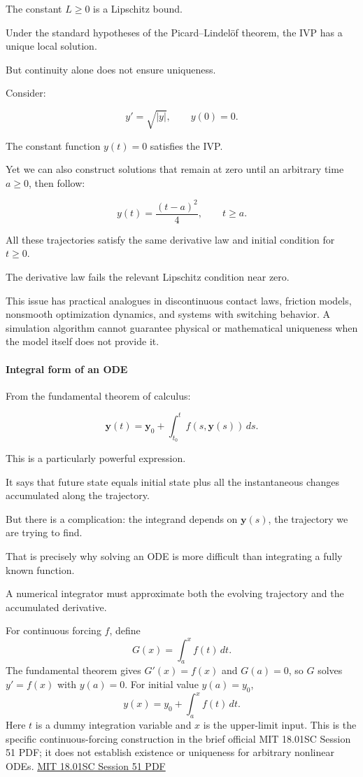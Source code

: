 The constant \(L\ge0\) is a Lipschitz bound.

Under the standard hypotheses of the Picard--Lindelöf theorem, the IVP has a unique local solution.

But continuity alone does not ensure uniqueness.

Consider:

\[
y'=\sqrt{|y|}, \qquad y(0)=0.
\]

The constant function \(y(t)=0\) satisfies the IVP.

Yet we can also construct solutions that remain at zero until an arbitrary time \(a\ge0\), then follow:

\[
y(t)=\frac{(t-a)^2}{4}, \qquad t\ge a.
\]

All these trajectories satisfy the same derivative law and initial condition for \(t\ge0\).

The derivative law fails the relevant Lipschitz condition near zero.

This issue has practical analogues in discontinuous contact laws, friction models, nonsmooth optimization dynamics, and systems with switching behavior. A simulation algorithm cannot guarantee physical or mathematical uniqueness when the model itself does not provide it.

\paragraph{Integral form of an ODE}\label{02-foundations-ii-ch022-integral-form-of-an-ode}

\hypertarget{02-foundations-ii-ch022-integral-form-of-an-ode}{}

From the fundamental theorem of calculus:

\[
\boxed{ \mathbf y(t) = \mathbf y_0+ \int_{t_0}^{t}f(s,\mathbf y(s))\,ds }.
\]

This is a particularly powerful expression.

It says that future state equals initial state plus all the instantaneous changes accumulated along the trajectory.

But there is a complication: the integrand depends on \(\mathbf y(s)\), the trajectory we are trying to find.

That is precisely why solving an ODE is more difficult than integrating a fully known function.

A numerical integrator must approximate both the evolving trajectory and the accumulated derivative.

For continuous forcing \(f\), define \[
G(x)=\int_a^x f(t)\,dt.
\] The fundamental theorem gives \(G'(x)=f(x)\) and \(G(a)=0\), so \(G\) solves \(y'=f(x)\) with \(y(a)=0\). For initial value \(y(a)=y_0\), \[
y(x)=y_0+\int_a^x f(t)\,dt.
\] Here \(t\) is a dummy integration variable and \(x\) is the upper-limit input. This is the specific continuous-forcing construction in the brief official MIT 18.01SC Session 51 PDF; it does not establish existence or uniqueness for arbitrary nonlinear ODEs. \href{https://ocw.mit.edu/courses/18-01sc-single-variable-calculus-fall-2010/2459faee7ec3308afd5cca2b95fad48e_MIT18_01SCF10_Ses51a.pdf}{MIT 18.01SC Session 51 PDF}

